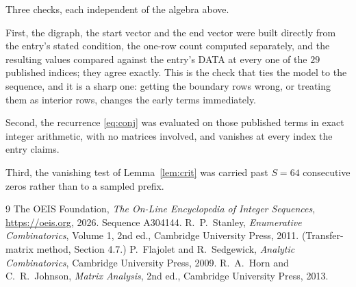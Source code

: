 \documentclass[11pt,a4paper]{article}
\theoremstyle{plain}
\theoremstyle{definition}
\begin{document}
Three checks, each independent of the algebra above.

First, the digraph, the start vector and the end vector were built directly from the
entry's stated condition, the one-row count computed separately, and the resulting values
compared against the entry's DATA at every one of the $29$ published indices; they
agree exactly. This is the check that ties the model to the sequence, and it is a sharp one:
getting the boundary rows wrong, or treating them as interior rows, changes the early terms
immediately.

Second, the recurrence \eqref{eq:conj} was evaluated on those published terms in exact
integer arithmetic, with no matrices involved, and vanishes at every index the entry claims.

Third, the vanishing test of Lemma~\ref{lem:crit} was carried past $S=64$ consecutive
zeros rather than to a sampled prefix.

\begin{thebibliography}{9}
 The OEIS Foundation, \emph{The On-Line Encyclopedia of Integer
Sequences}, \url{https://oeis.org}, 2026. Sequence A304144.
 R.~P.~Stanley, \emph{Enumerative Combinatorics}, Volume 1, 2nd ed.,
Cambridge University Press, 2011. (Transfer-matrix method, Section 4.7.)
 P.~Flajolet and R.~Sedgewick, \emph{Analytic Combinatorics}, Cambridge
University Press, 2009.
 R.~A.~Horn and C.~R.~Johnson, \emph{Matrix Analysis}, 2nd ed., Cambridge
University Press, 2013.
\end{thebibliography}
\end{document}
